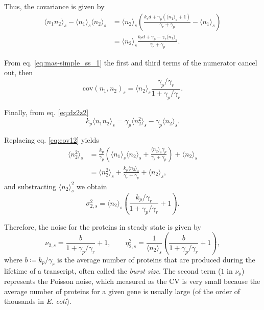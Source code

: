 Thus, the covariance is given by
\begin{align*}
  \langle n_1n_2 \rangle_s - \langle n_1 \rangle_s\langle n_2\rangle_s &= \langle n_2 \rangle_s \left(\frac{k_rd+\gamma_p\left(\langle n_1\rangle_s+1\right)}{\gamma_r+\gamma_p}-\langle n_1\rangle_s\right)\\
  &=\langle n_2\rangle_s\frac{k_rd+\gamma_p-\gamma_r\langle n_1\rangle_s}{\gamma_r+\gamma_p}.
\end{align*}

From eq. \eqref{eq:mas-simple_ss_1} the first and third terms of the numerator cancel out, then
\begin{equation}
  \label{eq:cov12}
  \text{cov}(n_1,n_2)_s = \langle n_2 \rangle_s\frac{\gamma_p/\gamma_r}{1+\gamma_p/\gamma_r}.
\end{equation}

Finally, from eq. \eqref{eq:dz2z2}
\begin{equation*}
k_p\langle n_1n_2\rangle_s = \gamma_p\langle n_2^2\rangle_s-\gamma_p\langle n_2\rangle_s.
\end{equation*}

Replacing eq. \eqref{eq:cov12} yields
\begin{align*}
  \langle n_2^2\rangle_s &= \frac{k_p}{\gamma_p}\left(\langle n_1 \rangle_s\langle n_2\rangle_s + \frac{\langle n_2\rangle_s\gamma_p}{\gamma_r+\gamma_p}\right) + \langle n_2 \rangle_s\\
  &=\langle n_2^2\rangle_s+\frac{k_p\langle n_2\rangle_s}{\gamma_r+\gamma_p}+\langle n_2 \rangle_s,
\end{align*}
and substracting $\langle n_2\rangle_s^2$ we obtain
\begin{equation*}
  \sigma_{2,s}^2 = \langle n_2\rangle_s\left(\frac{k_p/\gamma_r}{1+\gamma_p/\gamma_r}+1\right).
\end{equation*}

Therefore, the noise for the proteins in steady state is given by
\begin{equation}
  \label{eq:noise2}
  \nu_{2,s} = \frac{b}{1+\gamma_p/\gamma_r}+1, \quad \quad \eta_{2,s}^2 = \frac{1}{\langle n_2\rangle_s}\left(\frac{b}{1+\gamma_p/\gamma_r}+1\right),
\end{equation}
where $b\coloneqq k_p/\gamma_r$ is the average number of proteins that are produced during the lifetime of a transcript, often called the \textit{burst size}. The second term ($1$ in $\nu_p$) represents the Poisson noise, which measured as the CV is very small because the average number of proteins for a given gene is usually large (of the order of thousands in \textit{E. coli}).

